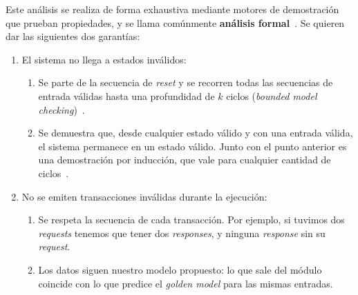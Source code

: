 Este análisis se realiza de forma exhaustiva mediante motores de demostración
que prueban propiedades, y se llama comúnmente \textbf{análisis
formal}~\cite{Seligman2023}. Se quieren dar las siguientes dos garantías:
\begin{enumerate}
  \item El sistema no llega a estados inválidos:
  \begin{enumerate}
    \item Se parte de la secuencia de \emph{reset} y se recorren todas las secuencias
      de entrada válidas hasta una profundidad de $k$ ciclos (\emph{bounded
      model checking})~\cite{Biere1999}.
    \item Se demuestra que, desde cualquier estado válido y con una entrada
      válida, el sistema permanece en un estado válido. Junto con el punto
      anterior es una demostración por inducción, que vale para cualquier
      cantidad de ciclos~\cite{Sheeran2000}.
  \end{enumerate}
  \item No se emiten transacciones inválidas durante la ejecución:
  \begin{enumerate}
    \item Se respeta la secuencia de cada transacción. Por ejemplo, si tuvimos
      dos \emph{requests} tenemos que tener dos \emph{responses}, y ninguna
      \emph{response} sin su \emph{request}.
    \item Los datos siguen nuestro modelo propuesto: lo que sale del módulo
      coincide con lo que predice el \emph{golden model} para las mismas entradas.
  \end{enumerate}
\end{enumerate}

\bibliografiacapitulo

